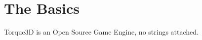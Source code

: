 

\chapter{The Basics}
\label{cha:basics}

Torque3D is an Open Source Game Engine, no strings attached. 

\blindtext
